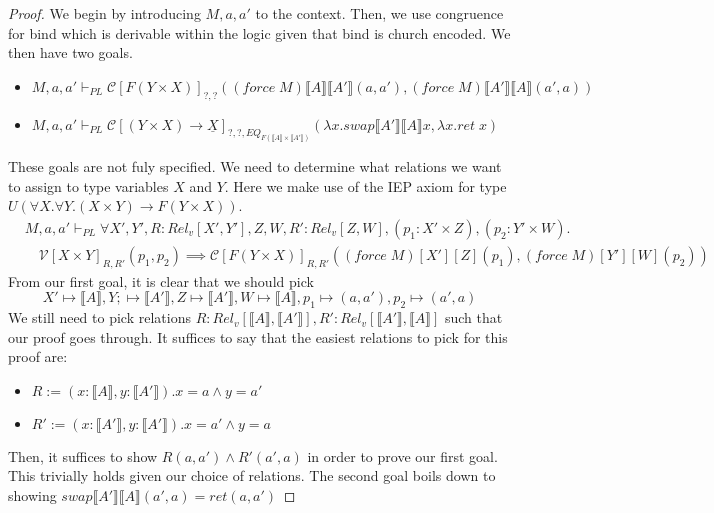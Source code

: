 \documentclass[acmsmall]{acmart}
\newcommand{\den}[1]{\llbracket #1\rrbracket}
\begin{document}
\begin{proof}
  We begin by introducing $M,a,a'$ to the context. Then, we use congruence for bind which is derivable within the logic given that bind is church encoded. We then have two goals.
  \begin{itemize}
    \item $M,a,a' \vdash_{PL} \mathcal{C}[F(Y\times X)]_{?,?}((force\;M)\den{A}\den{A'}(a,a'),(force\;M)\den{A'}\den{A}(a',a))$
    \item $M,a,a' \vdash_{PL} \mathcal{C}[(Y \times X) \to \underline{X}]_{?,?,EQ_{F(\den{A}\times \den{A'})}}(\lambda x. swap\den{A'}\den{A}x , \lambda x. ret\;x)$
  \end{itemize}
These goals are not fuly specified. We need to determine what relations we want to assign to type variables $X$ and $Y$. Here we make use of the IEP axiom for type $U(\forall X. \forall Y. (X \times Y) \to F(Y \times X))$.
\begin{align*} 
&M,a,a' \vdash_{PL} \forall X',Y',R:Rel_v[X',Y'],Z,W,R':Rel_v[Z,W],(p_1 : X' \times Z),(p_2 : Y' \times W).\\
&\quad\mathcal{V}[X\times Y]_{R,R'}(p_1,p_2) \implies \mathcal{C}[F(Y\times X)]_{R,R'}((force\;M)[X'][Z](p_1),(force\;M)[Y'][W](p_2))
\end{align*}
From our first goal, it is clear that we should pick
\[
  X' \mapsto \den{A}, Y; \mapsto \den{A'},Z \mapsto \den{A'}, W \mapsto \den{A}, p_1 \mapsto (a,a'), p_2 \mapsto (a',a)
\]
We still need to pick relations $R : Rel_v[\den{A},\den{A'}],R' : Rel_v[\den{A'},\den{A}]$ such that our proof goes through. It suffices to say that the easiest relations to pick for this proof are:
\begin{itemize}
  \item $R := (x : \den{A},y : \den{A'}). x = a \land y = a'$
  \item $R' := (x : \den{A'},y : \den{A'}). x = a' \land y = a$
\end{itemize}
Then, it suffices to show $R(a,a') \land R'(a',a)$ in order to prove our first goal. This trivially holds given our choice of relations.
The second goal boils down to showing $swap\den{A'}\den{A}(a',a)=ret(a,a')$
\end{proof}
\end{document}
